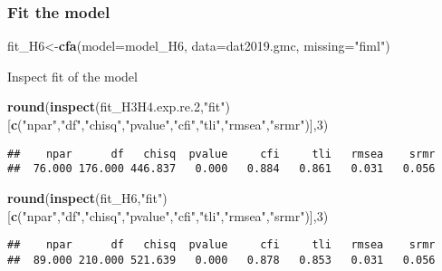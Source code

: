 \documentclass[
]{article}
\newenvironment{Shaded}{\begin{snugshade}}{\end{snugshade}}
\newcommand{\DataTypeTok}[1]{\textcolor[rgb]{0.13,0.29,0.53}{#1}}
\newcommand{\DecValTok}[1]{\textcolor[rgb]{0.00,0.00,0.81}{#1}}
\newcommand{\FloatTok}[1]{\textcolor[rgb]{0.00,0.00,0.81}{#1}}
\newcommand{\KeywordTok}[1]{\textcolor[rgb]{0.13,0.29,0.53}{\textbf{#1}}}
\newcommand{\NormalTok}[1]{#1}
\newcommand{\StringTok}[1]{\textcolor[rgb]{0.31,0.60,0.02}{#1}}
\begin{document}
\hypertarget{fit-the-model-3}{%
\subsubsection{Fit the model}\label{fit-the-model-3}}

\begin{Shaded}
\begin{Highlighting}[]
\NormalTok{fit_H6<-}\KeywordTok{cfa}\NormalTok{(}\DataTypeTok{model=}\NormalTok{model_H6,}
            \DataTypeTok{data=}\NormalTok{dat2019.gmc,}
            \DataTypeTok{missing=}\StringTok{"fiml"}\NormalTok{)}
\end{Highlighting}
\end{Shaded}

Inspect fit of the model

\begin{Shaded}
\begin{Highlighting}[]
\KeywordTok{round}\NormalTok{(}\KeywordTok{inspect}\NormalTok{(fit_H3H4.exp.re}\FloatTok{.2}\NormalTok{,}\StringTok{"fit"}\NormalTok{)}
\NormalTok{      [}\KeywordTok{c}\NormalTok{(}\StringTok{"npar"}\NormalTok{,}\StringTok{"df"}\NormalTok{,}\StringTok{"chisq"}\NormalTok{,}\StringTok{"pvalue"}\NormalTok{,}\StringTok{"cfi"}\NormalTok{,}\StringTok{"tli"}\NormalTok{,}\StringTok{"rmsea"}\NormalTok{,}\StringTok{"srmr"}\NormalTok{)],}\DecValTok{3}\NormalTok{)}
\end{Highlighting}
\end{Shaded}

\begin{verbatim}
##    npar      df   chisq  pvalue     cfi     tli   rmsea    srmr 
##  76.000 176.000 446.837   0.000   0.884   0.861   0.031   0.056
\end{verbatim}

\begin{Shaded}
\begin{Highlighting}[]
\KeywordTok{round}\NormalTok{(}\KeywordTok{inspect}\NormalTok{(fit_H6,}\StringTok{"fit"}\NormalTok{)}
\NormalTok{      [}\KeywordTok{c}\NormalTok{(}\StringTok{"npar"}\NormalTok{,}\StringTok{"df"}\NormalTok{,}\StringTok{"chisq"}\NormalTok{,}\StringTok{"pvalue"}\NormalTok{,}\StringTok{"cfi"}\NormalTok{,}\StringTok{"tli"}\NormalTok{,}\StringTok{"rmsea"}\NormalTok{,}\StringTok{"srmr"}\NormalTok{)],}\DecValTok{3}\NormalTok{)}
\end{Highlighting}
\end{Shaded}

\begin{verbatim}
##    npar      df   chisq  pvalue     cfi     tli   rmsea    srmr 
##  89.000 210.000 521.639   0.000   0.878   0.853   0.031   0.056
\end{verbatim}
\end{document}
